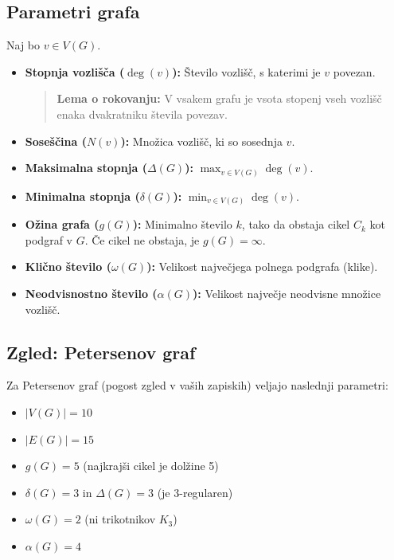\documentclass[11pt,paper=b5,DIV=13,headinclude,footinclude]{scrbook}
\begin{document}
\subsection{Parametri grafa}

Naj bo $v \in V(G)$.
\begin{itemize}
    \item \textbf{Stopnja vozlišča ($\deg(v)$):} Število vozlišč, s katerimi je $v$ povezan.
    \begin{quote}
      \textbf{Lema o rokovanju:} V vsakem grafu je vsota stopenj vseh vozlišč enaka dvakratniku števila povezav.
    \end{quote}
    \item \textbf{Soseščina ($N(v)$):} Množica vozlišč, ki so sosednja $v$.
    \item \textbf{Maksimalna stopnja ($\Delta(G)$):} $\max_{v \in V(G)} \deg(v)$.
    \item \textbf{Minimalna stopnja ($\delta(G)$):} $\min_{v \in V(G)} \deg(v)$.
    \item \textbf{Ožina grafa ($g(G)$):} Minimalno število $k$, tako da obstaja cikel $C_k$ kot podgraf v $G$. Če cikel ne obstaja, je $g(G) = \infty$.
    \item \textbf{Klično število ($\omega(G)$):} Velikost največjega polnega podgrafa (klike).
    \item \textbf{Neodvisnostno število ($\alpha(G)$):} Velikost največje neodvisne množice vozlišč.
\end{itemize}

\subsection*{Zgled:  Petersenov graf}

Za Petersenov graf (pogost zgled v vaših zapiskih) veljajo naslednji parametri:
\begin{itemize}
    \item $|V(G)| = 10$
    \item $|E(G)| = 15$
    \item $g(G) = 5$ (najkrajši cikel je dolžine 5)
    \item $\delta(G) = 3$ in $\Delta(G) = 3$ (je 3-regularen)
    \item $\omega(G) = 2$ (ni trikotnikov $K_3$)
    \item $\alpha(G) = 4$
\end{itemize}
\end{document}
